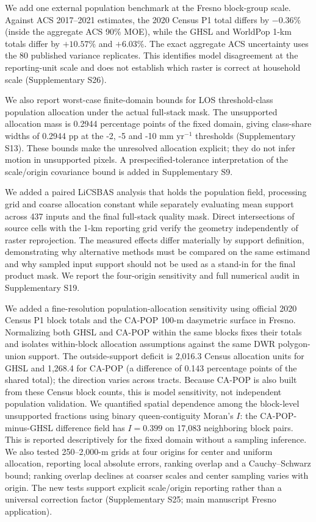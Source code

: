 \documentclass[11pt,a4paper]{article}
\begin{document}
We add one external population benchmark at the Fresno block-group scale. Against ACS 2017--2021 estimates, the 2020 Census P1 total differs by $-0.36\%$ (inside the aggregate ACS 90\% MOE), while the GHSL and WorldPop 1-km totals differ by $+10.57\%$ and $+6.03\%$. The exact aggregate ACS uncertainty uses the 80 published variance replicates. This identifies model disagreement at the reporting-unit scale and does not establish which raster is correct at household scale (Supplementary S26).

We also report worst-case finite-domain bounds for LOS threshold-class population allocation under the actual full-stack mask. The unsupported allocation mass is 0.2944 percentage points of the fixed domain, giving class-share widths of 0.2944 pp at the -2, -5 and -10 mm yr$^{-1}$ thresholds (Supplementary S13). These bounds make the unresolved allocation explicit; they do not infer motion in unsupported pixels. A prespecified-tolerance interpretation of the scale/origin covariance bound is added in Supplementary S9.

We added a paired LiCSBAS analysis that holds the population field, processing grid and coarse allocation constant while separately evaluating mean support across 437 inputs and the final full-stack quality mask. Direct intersections of source cells with the 1-km reporting grid verify the geometry independently of raster reprojection. The measured effects differ materially by support definition, demonstrating why alternative methods must be compared on the same estimand and why sampled input support should not be used as a stand-in for the final product mask. We report the four-origin sensitivity and full numerical audit in Supplementary S19.



We added a fine-resolution population-allocation sensitivity using official 2020 Census P1 block totals and the CA-POP 100-m dasymetric surface in Fresno. Normalizing both GHSL and CA-POP within the same blocks fixes their totals and isolates within-block allocation assumptions against the same DWR polygon-union support. The outside-support deficit is 2,016.3 Census allocation units for GHSL and 1,268.4 for CA-POP (a difference of 0.143 percentage points of the shared total); the direction varies across tracts. Because CA-POP is also built from these Census block counts, this is model sensitivity, not independent population validation. We quantified spatial dependence among the block-level unsupported fractions using binary queen-contiguity Moran's $I$: the CA-POP-minus-GHSL difference field has $I=0.399$ on 17,083 neighboring block pairs. This is reported descriptively for the fixed domain without a sampling inference. We also tested 250--2,000-m grids at four origins for center and uniform allocation, reporting local absolute errors, ranking overlap and a Cauchy--Schwarz bound; ranking overlap declines at coarser scales and center sampling varies with origin. The new tests support explicit scale/origin reporting rather than a universal correction factor (Supplementary S25; main manuscript Fresno application).
\end{document}
